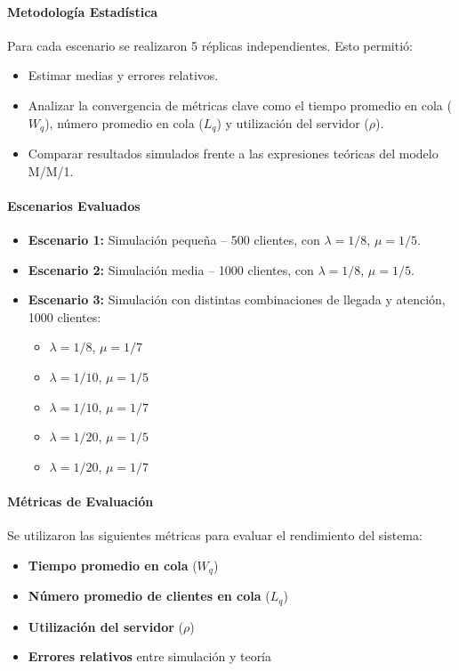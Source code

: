\documentclass{article}
\begin{document}
\paragraph{Metodología Estadística}
Para cada escenario se realizaron 5 réplicas independientes. Esto permitió:
\begin{itemize}
    \item Estimar medias y errores relativos.
    \item Analizar la convergencia de métricas clave como el tiempo promedio en cola ($W_q$), número promedio en cola ($L_q$) y utilización del servidor ($\rho$).
    \item Comparar resultados simulados frente a las expresiones teóricas del modelo M/M/1.
\end{itemize}

\paragraph{Escenarios Evaluados}
\begin{itemize}
    \item \textbf{Escenario 1:} Simulación pequeña – 500 clientes, con $\lambda = 1/8$, $\mu = 1/5$.
    \item \textbf{Escenario 2:} Simulación media – 1000 clientes, con $\lambda = 1/8$, $\mu = 1/5$.
    \item \textbf{Escenario 3:} Simulación con distintas combinaciones de llegada y atención, 1000 clientes:
    \begin{itemize}
        \item $\lambda = 1/8$, $\mu = 1/7$
        \item $\lambda = 1/10$, $\mu = 1/5$
        \item $\lambda = 1/10$, $\mu = 1/7$
        \item $\lambda = 1/20$, $\mu = 1/5$
        \item $\lambda = 1/20$, $\mu = 1/7$
    \end{itemize}
\end{itemize}

\paragraph{Métricas de Evaluación}
Se utilizaron las siguientes métricas para evaluar el rendimiento del sistema:
\begin{itemize}
    \item \textbf{Tiempo promedio en cola} ($W_q$)
    \item \textbf{Número promedio de clientes en cola} ($L_q$)
    \item \textbf{Utilización del servidor} ($\rho$)
    \item \textbf{Errores relativos} entre simulación y teoría
\end{itemize}
\end{document}
